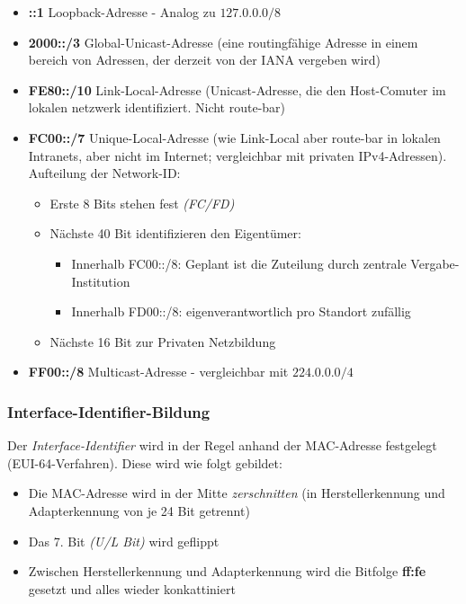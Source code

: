 \documentclass[a4paper, 12pt]{report}
\begin{document}
\begin{itemize}
	\item \textbf{::1} Loopback-Adresse - Analog zu $127.0.0.0/8$
	\item \textbf{2000::/3} Global-Unicast-Adresse (eine routingfähige
		Adresse in einem bereich von Adressen, der derzeit von der IANA
		vergeben wird)
	\item \textbf{FE80::/10} Link-Local-Adresse (Unicast-Adresse, die den
		Host-Comuter im lokalen netzwerk identifiziert. Nicht route-bar)
	\item \textbf{FC00::/7} Unique-Local-Adresse (wie Link-Local aber
		route-bar in lokalen Intranets, aber nicht im Internet;
		vergleichbar mit privaten IPv4-Adressen). Aufteilung der
		Network-ID:
	\begin{itemize}
		\item Erste 8 Bits stehen fest \emph{(FC/FD)}
		\item Nächste 40 Bit identifizieren den Eigentümer:
		\begin{itemize}
			\item Innerhalb FC00::/8: Geplant ist die
				Zuteilung durch zentrale Vergabe-
				Institution
			\item Innerhalb FD00::/8: eigenverantwortlich
				pro Standort zufällig
		\end{itemize}
		\item Nächste 16 Bit zur Privaten Netzbildung
	\end{itemize}
	\item \textbf{FF00::/8} Multicast-Adresse - vergleichbar mit
		$224.0.0.0/4$
\end{itemize}

\subsubsection{Interface-Identifier-Bildung}

Der \emph{Interface-Identifier} wird in der Regel anhand der MAC-Adresse
festgelegt (EUI-64-Verfahren). Diese wird wie folgt gebildet:

\begin{itemize}
	\item Die MAC-Adresse wird in der Mitte \emph{zerschnitten} (in
		Herstellerkennung und Adapterkennung von je 24 Bit getrennt)
	\item Das 7. Bit \emph{(U/L Bit)} wird geflippt
	\item Zwischen Herstellerkennung und Adapterkennung wird die Bitfolge
		\textbf{ff:fe} gesetzt und alles wieder konkattiniert
\end{itemize}
\end{document}
